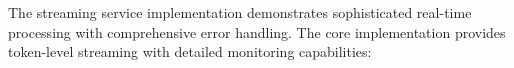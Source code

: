 The streaming service implementation demonstrates sophisticated real-time processing with comprehensive error handling. The core implementation provides token-level streaming with detailed monitoring capabilities:


